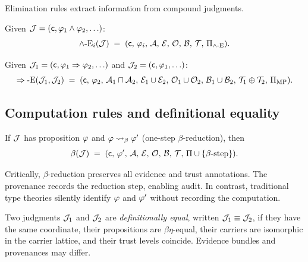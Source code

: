 \documentclass[11pt]{article}
\begin{document}
Elimination rules extract information from compound judgments.

\begin{definition}
Given $\mathcal{J} = (\mathsf{c}, \varphi_1 \wedge \varphi_2, \ldots)$:
\[
  \wedge\text{-}\mathrm{E}_i(\mathcal{J}) \;=\;
  (\mathsf{c},\,\varphi_i,\,\mathcal{A},\,\mathcal{E},\,\mathcal{O},\,\mathcal{B},\,\mathcal{T},\,\Pi_{\wedge\text{-E}}).
\]
\end{definition}

\begin{definition}
Given $\mathcal{J}_1 = (\mathsf{c}, \varphi_1 \Rightarrow \varphi_2, \ldots)$ and
$\mathcal{J}_2 = (\mathsf{c}, \varphi_1, \ldots)$:
\[
  \Rightarrow\text{-}\mathrm{E}(\mathcal{J}_1, \mathcal{J}_2) \;=\;
  (\mathsf{c},\,\varphi_2,\,\mathcal{A}_1 \sqcap \mathcal{A}_2,\,\mathcal{E}_1 \cup \mathcal{E}_2,\,\mathcal{O}_1 \cup \mathcal{O}_2,\,\mathcal{B}_1 \cup \mathcal{B}_2,\,\mathcal{T}_1 \oplus \mathcal{T}_2,\,\Pi_{\mathrm{MP}}).
\]
\end{definition}

\subsection{Computation rules and definitional equality}

\begin{definition}
If $\mathcal{J}$ has proposition $\varphi$ and $\varphi \rightsquigarrow_\beta \varphi'$
(one-step $\beta$-reduction), then
\[
  \beta(\mathcal{J}) \;=\;
  (\mathsf{c},\,\varphi',\,\mathcal{A},\,\mathcal{E},\,\mathcal{O},\,\mathcal{B},\,\mathcal{T},\,\Pi \cup \{\beta\text{-step}\}).
\]
\end{definition}

\begin{remark}
Critically, $\beta$-reduction preserves all evidence and trust annotations.
The provenance records the reduction step, enabling audit.
In contrast, traditional type theories silently identify $\varphi$ and $\varphi'$
without recording the computation.
\end{remark}

\begin{definition}
Two judgments $\mathcal{J}_1$ and $\mathcal{J}_2$ are \emph{definitionally equal},
written $\mathcal{J}_1 \equiv \mathcal{J}_2$, if they have the same coordinate, their
propositions are $\beta\eta$-equal, their carriers are isomorphic in the
carrier lattice, and their trust levels coincide.
Evidence bundles and provenances may differ.
\end{definition}


\end{document}
